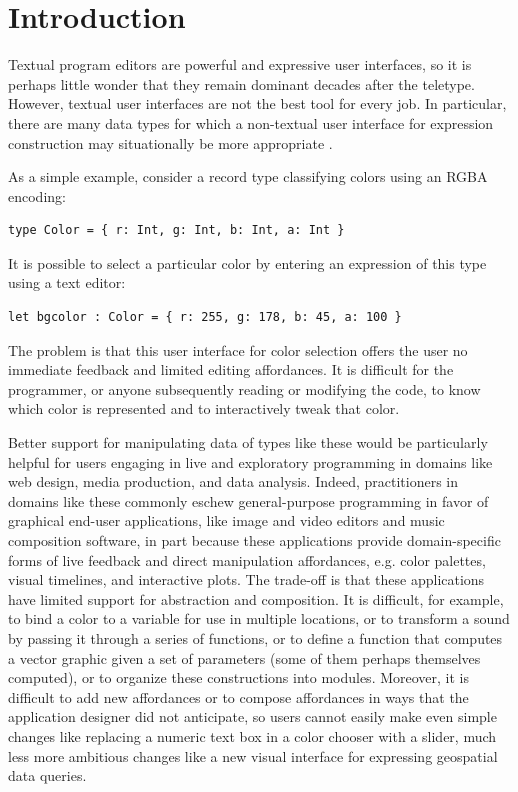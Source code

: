 \section{Introduction}\label{sec:intro}
Textual program editors are powerful and expressive user interfaces,
so it is perhaps little wonder that they remain dominant decades after the teletype.
However, textual user interfaces are not the best tool for every job.
In particular, there are many
data types for which a non-textual
user interface for expression construction may situationally be more appropriate \cite{Graphite}.

As a simple example, consider a record type
classifying colors using an RGBA encoding:
\begin{lstlisting}[numbers=none]
type Color = { r: Int, g: Int, b: Int, a: Int }
\end{lstlisting}
It is possible to select a particular color by entering
an expression of this type using a text editor:
\begin{lstlisting}[numbers=none]
let bgcolor : Color = { r: 255, g: 178, b: 45, a: 100 }
\end{lstlisting}
The problem is that this user interface for color selection
offers the user no immediate feedback
and limited editing affordances.
It is difficult for the programmer, or anyone subsequently reading or modifying the code, to know which color is represented
and to interactively tweak that color.

Better support for manipulating data of types like these would be particularly helpful for users engaging in
live and exploratory programming in domains like web design, media production,
and data analysis. Indeed, practitioners in domains like these commonly eschew general-purpose programming
in favor of graphical end-user applications, like %
image and video editors and music composition software,
in part because these applications provide domain-specific forms of live feedback and
direct manipulation affordances, e.g. color palettes, visual timelines, and interactive plots.
The trade-off is that these applications have limited support for abstraction and composition.
It is difficult, for example, to bind a
color to a variable for use in multiple locations,
or to transform a sound by passing it through a series of functions,
or to define a function that computes a vector graphic given a set
of parameters (some of them perhaps themselves computed),
or to organize these constructions into modules.
Moreover, it is difficult to add new affordances or to compose
affordances in ways that the application designer did not anticipate,
so users cannot easily make even simple changes like replacing a numeric text box in a color chooser with a slider,
much less more ambitious changes like a new visual interface for expressing geospatial data queries.

